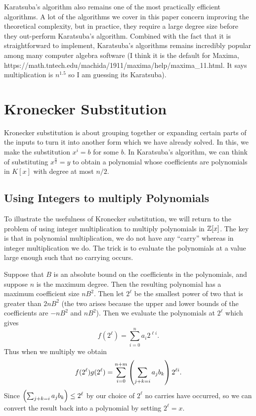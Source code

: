 Karatsuba's algorithm also remains one of the most practically efficient algorithms. A lot of the algorithms we cover in this paper concern improving the theoretical complexity, but in practice, they require a large degree size before they out-perform Karatsuba's algorithm. Combined with the fact that it is straightforward to implement, Karatsuba's algorithms remains incredibly popular among many computer algebra software (I think it is the default for Maxima, https://math.tntech.edu/machida/1911/maxima/help/maxima\_11.html. It says multiplication is $n^{1.5}$ so I am guessing its Karatsuba).


\section{Kronecker Substitution}%
\label{sub:kronecker_substitution}

Kronecker substitution is about grouping together or expanding certain parts of the inputs to turn it into another form which we have already solved. In this, we make the substitution $x^i = b$ for some $b$. In Karatsuba's algorithm, we can think of substituting $x^{\frac{n}{2}} = y$ to obtain a polynomial whose coefficients are polynomials in $K[x]$ with degree at most $n/2$.

\subsection{Using Integers to multiply Polynomials}%
\label{sub:Using Integers to multiply Polynomials}

To illustrate the usefulness of Kronecker substitution, we will return to the problem of using integer multiplication to multiply polynomials in ${\mathbb Z}[x]$. The key is that in polynomial multiplication, we do not have any ``carry'' whereas in integer multiplication we do. The trick is to evaluate the polynomials at a value large enough such that no carrying occurs.

Suppose that $B$ is an absolute bound on the coefficients in the polynomials, and suppose $n$ is the maximum degree. Then the resulting polynomial has a maximum coefficient size $nB^2$. Then let $2^\ell$ be the smallest power of two that is greater than $2nB^2$ (the two arises because the upper and lower bounds of the coefficients are $-nB^2$ and $nB^2$). Then we evaluate the polynomials at $2^\ell$ which gives
\[
    f(2^\ell) = \sum^n_{i = 0} a_i 2^{\ell i}.
\]
Thus when we multiply we obtain
\[
    f(2^\ell)g(2^\ell) = \sum^{n+m}_{i=0} \left(\sum_{j + k = i} a_jb_k\right)2^{\ell i}.
\]
Since $\left(\sum_{j + k = i}a_j b_k\right) \leq 2^{\ell}$ by our choice of $2^\ell$ no carries have occurred, so we can convert the result back into a polynomial by setting $2^\ell = x$.

